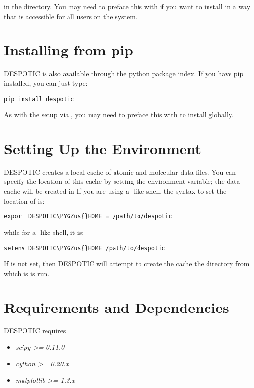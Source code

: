 \documentclass[letterpaper,10pt,english]{sphinxmanual}
\def\PYGZus{\char`\_}
\begin{document}
in the  directory. You may need to preface this with
 if you want to install in a way that is accessible for all
users on the system.


\section{Installing from pip}
\label{installation:installing-from-pip}
DESPOTIC is also available through the python package index. If you
have pip installed, you can just type:

\begin{Verbatim}[commandchars=\\\{\}]
pip install despotic
\end{Verbatim}

As with the setup via , you may need to preface this with
 to install globally.


\section{Setting Up the Environment}
\label{installation:setting-up-the-environment}
DESPOTIC creates a local cache of atomic and molecular data files. You
can specify the location of this cache by setting the
 environment variable; the data cache will be
created in  If you are using a -like
shell, the syntax to set the location of  is:

\begin{Verbatim}[commandchars=\\\{\}]
export DESPOTIC\PYGZus{}HOME = /path/to/despotic
\end{Verbatim}

while for a -like shell, it is:

\begin{Verbatim}[commandchars=\\\{\}]
setenv DESPOTIC\PYGZus{}HOME /path/to/despotic
\end{Verbatim}

If  is not set, then DESPOTIC will attempt to create
the cache the directory from which is is run.


\section{Requirements and Dependencies}
\label{installation:requirements-and-dependencies}
DESPOTIC requires
\begin{itemize}
\item {} 
\emph{scipy \textgreater{}= 0.11.0}

\item {} 
\emph{cython \textgreater{}= 0.20.x}

\item {} 
\emph{matplotlib \textgreater{}= 1.3.x}

\end{itemize}
\end{document}
